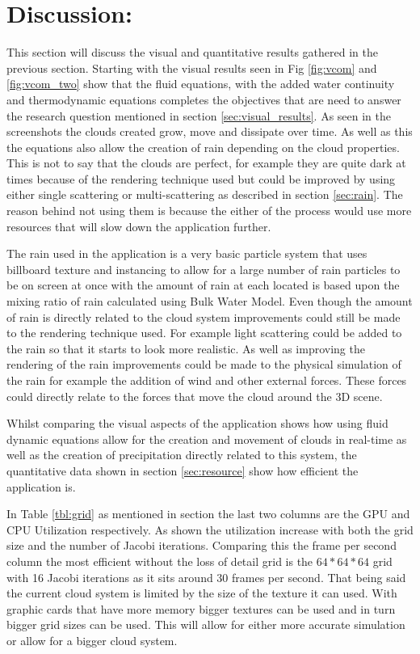 \clearpage
\section{Discussion:}
\label{sec:disscus}

This section will discuss the visual and quantitative results gathered in the previous section.
Starting with the visual results seen in Fig \ref{fig:vcom} and \ref{fig:vcom_two} show that the fluid equations, with the added water continuity and thermodynamic equations completes the objectives that are need to answer the research question mentioned in section \ref{sec:visual_results}.
As seen in the screenshots the clouds created grow, move and dissipate over time. As well as this the equations also allow the creation of rain depending on the cloud properties.
This is not to say that the clouds are perfect, for example they are quite dark at times because of the rendering technique used but could be improved by using either single scattering or multi-scattering  as described in section \ref{sec:rain}.
The reason behind not using them is because the either of the process would use more resources that will slow down the application further.
 
The rain used in the application is a very basic particle system that uses billboard texture and instancing to allow for a large number of rain particles to be on screen at once with the amount of rain at each located is based upon the mixing ratio of rain calculated using \cite{houze1994cloud} Bulk Water Model.
Even though the amount of rain is directly related to the cloud system improvements could still be made to the rendering technique used.
For example light scattering could be added to the rain so that it starts to look more realistic.
As well as improving the rendering of the rain improvements could be made to the physical simulation of the rain for example the addition of wind and other external forces.
These forces could directly relate to the forces that move the cloud around the 3D scene. 

Whilst comparing the visual aspects of the application shows how using fluid dynamic equations allow for the creation and movement of clouds in real-time as well as the creation of precipitation directly related to this system, the quantitative data shown in section \ref{sec:resource}  show how efficient the application is.

In Table \ref{tbl:grid} as mentioned in section the last two columns are the GPU and CPU Utilization respectively.
As shown the utilization increase with both the grid size and the number of Jacobi iterations.
Comparing this the frame per second column the most efficient without the loss of detail grid is the $64*64*64$ grid with 16 Jacobi iterations as it sits around 30 frames per second.
That being said the current cloud system is limited by the size of the texture it can used.
With graphic cards that have more memory bigger textures can be used and in turn bigger grid sizes can be used.
This will allow for either more accurate simulation or allow for a bigger cloud system.


